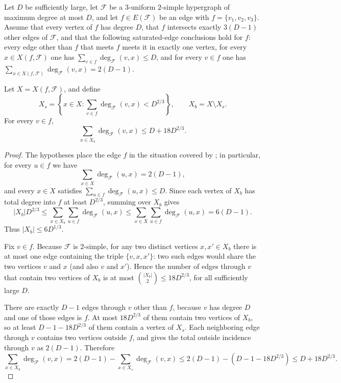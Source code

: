 \begin{lemma}
Let $D$ be sufficiently large, let $\mathcal F$ be a $3$-uniform
$2$-simple hypergraph of maximum degree at most $D$, and let
$f\in E(\mathcal F)$ be an edge with $f=\{v_1,v_2,v_3\}$.  Assume that
every vertex of $f$ has degree $D$, that $f$ intersects exactly $3(D-1)$
other edges of $\mathcal F$, and that the following saturated-edge
conclusions hold for $f$: every edge other than $f$ that meets $f$ meets it
in exactly one vertex, for every $x\in X(f,\mathcal F)$ one has
$\sum_{v\in f}\deg_{\mathcal F}(v,x)\le D$, and for every $v\in f$ one has
$\sum_{x\in X(f,\mathcal F)}\deg_{\mathcal F}(v,x)=2(D-1)$.

Let $X=X(f,\mathcal F)$, and define
\[
X_s=\left\{x\in X:\sum_{v\in f}\deg_{\mathcal F}(v,x)<D^{2/3}\right\},
\qquad
X_b=X\setminus X_s .
\]
For every $v\in f$,
\[
\sum_{x\in X_b}\deg_{\mathcal F}(v,x)\le D+18D^{2/3}.
\]
\end{lemma}
\begin{proof}
The hypotheses place the edge $f$ in the situation covered by
; in particular, for every $u\in f$ we have
\[
\sum_{x\in X}\deg_{\mathcal F}(u,x)=2(D-1),
\]
and every $x\in X$ satisfies
$\sum_{u\in f}\deg_{\mathcal F}(u,x)\le D$.  Since each vertex of $X_b$ has
total degree into $f$ at least $D^{2/3}$, summing over $X_b$ gives
\[
|X_b|D^{2/3}
\le \sum_{x\in X_b}\sum_{u\in f}\deg_{\mathcal F}(u,x)
\le \sum_{x\in X}\sum_{u\in f}\deg_{\mathcal F}(u,x)
=6(D-1).
\]
Thus $|X_b|\le 6D^{1/3}$.

Fix $v\in f$.  Because $\mathcal F$ is $2$-simple, for any two distinct
vertices $x,x'\in X_b$ there is at most one edge containing the triple
$\{v,x,x'\}$: two such edges would share the two vertices $v$ and $x$ (and
also $v$ and $x'$).  Hence the number of edges through $v$ that contain two
vertices of $X_b$ is at most $\binom{|X_b|}{2}\le 18D^{2/3}$, for all
sufficiently large $D$.

There are exactly $D-1$ edges through $v$ other than $f$, because $v$ has
degree $D$ and one of those edges is $f$.  At most $18D^{2/3}$ of them
contain two vertices of $X_b$, so at least $D-1-18D^{2/3}$ of them contain a
vertex of $X_s$.  Each neighboring edge through $v$ contains two vertices
outside $f$, and  gives the total outside
incidence through $v$ as $2(D-1)$.  Therefore
\[
\sum_{x\in X_b}\deg_{\mathcal F}(v,x)
=2(D-1)-\sum_{x\in X_s}\deg_{\mathcal F}(v,x)
\le 2(D-1)-(D-1-18D^{2/3})
\le D+18D^{2/3}.
\]
\end{proof}
